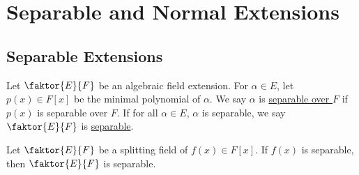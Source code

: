 \documentclass[11pt]{article}
\newcommand{\quotient}[2]{\faktor{#1}{#2}}
\begin{document}
\pagebreak
\section{Separable and Normal Extensions}
\subsection{Separable Extensions}
\begin{definition}
Let $\quotient{E}{F}$ be an algebraic field extension. For $\alpha \in E$, let
$p(x) \in F[x]$ be the minimal polynomial of $\alpha$. We say $\alpha$ is
\underline{separable over $F$} if $p(x)$ is separable over $F$. If for all
$\alpha \in E$, $\alpha$ is separable, we say $\quotient{E}{F}$ is
\underline{separable}.
\end{definition}
\begin{theorem}
Let $\quotient{E}{F}$ be a splitting field of $f(x)\in F[x]$. If $f(x)$ is
separable, then $\quotient{E}{F}$ is separable.
\label{theorem46}
\end{theorem}
\end{document}
